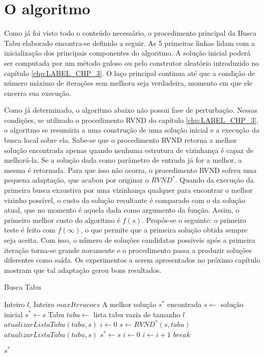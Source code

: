 \section{O algoritmo}\label{sec:LABEL_CHP_6_SEC_E}

\par Como já foi visto todo o conteúdo necessário, o procedimento principal da Busca Tabu elaborado encontra-se definido a seguir. As 5 primeiras linhas lidam com a inicialização dos principais componentes do algoritmo. A solução inicial poderá ser computada por um método guloso ou pelo construtor aleatório introduzido no capítulo \ref{chp:LABEL_CHP_3}. O laço principal continua até que a condição de número máximo de iterações sem melhora seja verdadeira, momento em que ele encerra sua execução.

\par Como já determinado, o algoritmo abaixo não possui fase de perturbação. Nessas condições, se utilizado o procedimento RVND do capítulo \ref{chp:LABEL_CHP_3}, o algoritmo se resumiria a uma construção de uma solução inicial e a execução da busca local sobre ela. Sabe-se que o procedimento RVND retorna a melhor solução encontrada apenas quando nenhuma estrutura de vizinhança é capaz de melhorá-la. Se a solução dada como parâmetro de entrada já for a melhor, a mesma é retornada. Para que isso não ocorra, o procedimento RVND sofreu uma pequena adaptação, que acabou por originar o $RVND^*$. Quando da execução da primeira busca exaustiva por uma vizinhança qualquer para encontrar o melhor vizinho possível, o custo da solução resultante é comparado com o da solução atual, que no momento é aquela dada como argumento da função. Assim, o primeiro melhor custo do algoritmo é $f(s)$. Propôs-se o seguinte: o primeiro teste é feito com $f(\infty)$, o que permite que a primeira solução obtida sempre seja aceita. Com isso, o número de soluções candidatas possíveis após a primeira iteração torna-se grande novamente e o procedimento passa a produzir soluções diferentes como saída. Os experimentos a serem apresentados no próximo capítulo mostram que tal adaptação gerou bons resultados.


	\begin{algorithm}[H]
    \caption{Busca Tabu}
    \begin{algorithmic}[1]
    \REQUIRE Inteiro $l$, Inteiro $maxIteracoes$
    \ENSURE A melhor solução $s^*$ encontrada
    \STATE $s \leftarrow$ solução inicial
    \STATE $s^* \leftarrow s$
    \STATE Tabu $tabu \leftarrow$ lista tabu vazia de tamanho $l$
    \STATE $atualizarListaTabu(tabu, s)$
    \STATE $i \leftarrow 0$
    \WHILE{\TRUE}
    	\STATE $s \leftarrow RVND^*(s, tabu)$
    	\STATE $atualizarListaTabu(tabu, s)$
			\STATE $s^* \leftarrow s$
		    \STATE $i \leftarrow 0$
		\ELSE
			\STATE $i \leftarrow i + 1$
				\STATE $break$
			\ENDIF		
		\ENDIF
    \ENDWHILE
    
    \RETURN $s^*$
    \end{algorithmic}
    \end{algorithm}
